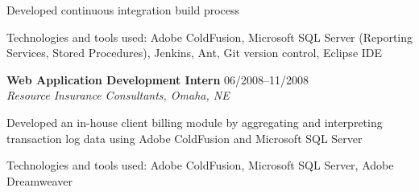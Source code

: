 \begin{itemize1}
\begin{itemize1}
			\item Developed continuous integration build process
			\item Technologies and tools used: Adobe ColdFusion, Microsoft SQL Server (Reporting Services, Stored Procedures), Jenkins, Ant, Git version control, Eclipse IDE
		\end{itemize1}
	\item \textbf{Web Application Development Intern} \textopenbullet{} 06/2008--11/2008 \\
		\textit{Resource Insurance Consultants, Omaha, NE} \vspace{-1.5mm}
		\begin{itemize1}
			\item Developed an in-house client billing module by aggregating and interpreting transaction log data using Adobe ColdFusion and Microsoft SQL Server
			\item Technologies and tools used: Adobe ColdFusion, Microsoft SQL Server, Adobe Dreamweaver 
		\end{itemize1}
		

		

\end{itemize1}

